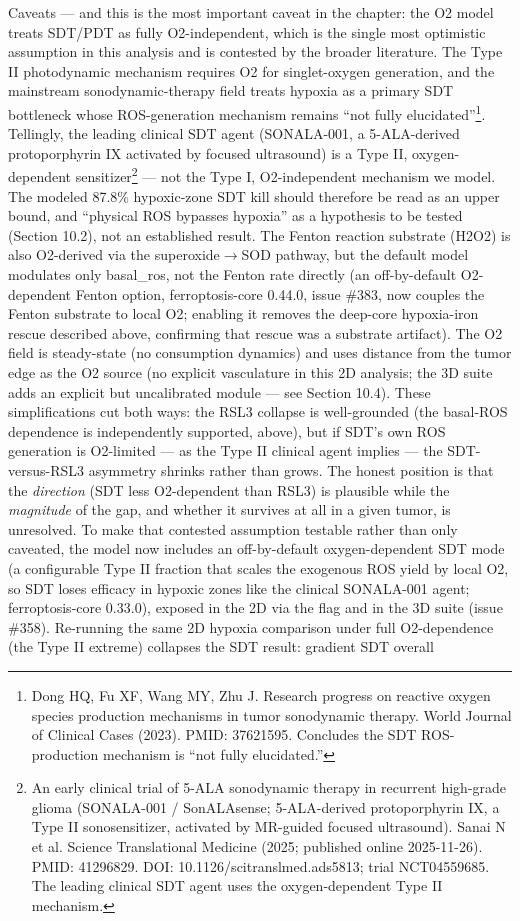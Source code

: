 \documentclass[11pt,twoside,openright]{report}
\begin{document}
Caveats --- and this is the most important caveat in the chapter: the O2 model treats SDT/PDT as fully O2-independent, which is the single most optimistic assumption in this analysis and is contested by the broader literature. The Type II photodynamic mechanism requires O2 for singlet-oxygen generation, and the mainstream sonodynamic-therapy field treats hypoxia as a primary SDT bottleneck whose ROS-generation mechanism remains ``not fully elucidated''\footnote{Dong HQ, Fu XF, Wang MY, Zhu J. Research progress on reactive oxygen species production mechanisms in tumor sonodynamic therapy. World Journal of Clinical Cases (2023). PMID: 37621595. Concludes the SDT ROS-production mechanism is ``not fully elucidated.''}. Tellingly, the leading clinical SDT agent (SONALA-001, a 5-ALA-derived protoporphyrin IX activated by focused ultrasound) is a Type II, oxygen-dependent sensitizer\footnote{An early clinical trial of 5-ALA sonodynamic therapy in recurrent high-grade glioma (SONALA-001 / SonALAsense; 5-ALA-derived protoporphyrin IX, a Type II sonosensitizer, activated by MR-guided focused ultrasound). Sanai N et al. Science Translational Medicine (2025; published online 2025-11-26). PMID: 41296829. DOI: 10.1126/scitranslmed.ads5813; trial NCT04559685. The leading clinical SDT agent uses the oxygen-dependent Type II mechanism.} --- not the Type I, O2-independent mechanism we model. The modeled 87.8\% hypoxic-zone SDT kill should therefore be read as an upper bound, and ``physical ROS bypasses hypoxia'' as a hypothesis to be tested (Section 10.2), not an established result. The Fenton reaction substrate (H2O2) is also O2-derived via the superoxide$\rightarrow$SOD pathway, but the default model modulates only basal\_ros, not the Fenton rate directly (an off-by-default O2-dependent Fenton option, ferroptosis-core 0.44.0, issue \#383, now couples the Fenton substrate to local O2; enabling it removes the deep-core hypoxia-iron rescue described above, confirming that rescue was a substrate artifact). The O2 field is steady-state (no consumption dynamics) and uses distance from the tumor edge as the O2 source (no explicit vasculature in this 2D analysis; the 3D suite adds an explicit but uncalibrated  module --- see Section 10.4). These simplifications cut both ways: the RSL3 collapse is well-grounded (the basal-ROS dependence is independently supported, above), but if SDT's own ROS generation is O2-limited --- as the Type II clinical agent implies --- the SDT-versus-RSL3 asymmetry shrinks rather than grows. The honest position is that the \textit{direction} (SDT less O2-dependent than RSL3) is plausible while the \textit{magnitude} of the gap, and whether it survives at all in a given tumor, is unresolved. To make that contested assumption testable rather than only caveated, the model now includes an off-by-default oxygen-dependent SDT mode (a configurable Type II fraction that scales the exogenous ROS yield by local O2, so SDT loses efficacy in hypoxic zones like the clinical SONALA-001 agent; ferroptosis-core 0.33.0), exposed in the 2D  via the  flag and in the 3D suite (issue \#358). Re-running the same 2D hypoxia comparison under full O2-dependence (the Type II extreme) collapses the SDT result: gradient SDT overall 
\end{document}
